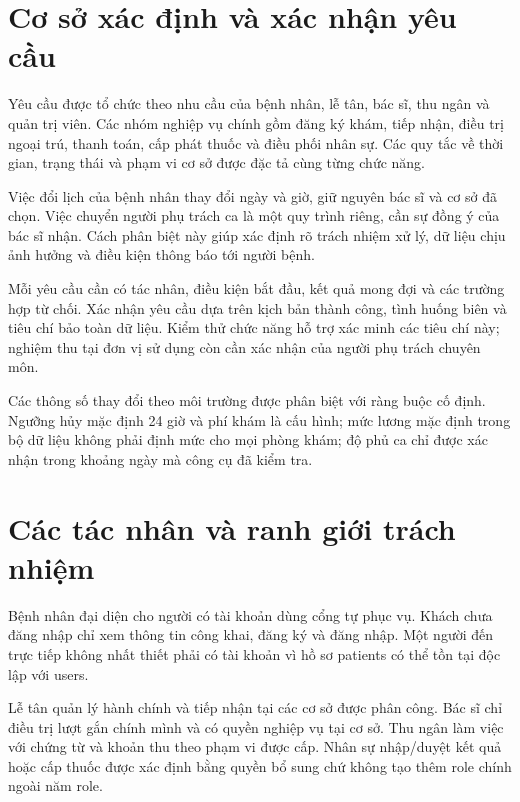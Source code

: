 \section{Cơ sở xác định và xác nhận yêu cầu}
Yêu cầu được tổ chức theo nhu cầu của bệnh nhân, lễ tân, bác sĩ, thu ngân và quản trị viên.\allowbreak{} Các nhóm nghiệp vụ chính gồm đăng ký khám, tiếp nhận, điều trị ngoại trú, thanh toán, cấp phát thuốc và điều phối nhân sự.\allowbreak{} Các quy tắc về thời gian, trạng thái và phạm vi cơ sở được đặc tả cùng từng chức năng.\allowbreak{}

Việc đổi lịch của bệnh nhân thay đổi ngày và giờ, giữ nguyên bác sĩ và cơ sở đã chọn.\allowbreak{} Việc chuyển người phụ trách ca là một quy trình riêng, cần sự đồng ý của bác sĩ nhận.\allowbreak{} Cách phân biệt này giúp xác định rõ trách nhiệm xử lý, dữ liệu chịu ảnh hưởng và điều kiện thông báo tới người bệnh.\allowbreak{}

Mỗi yêu cầu cần có tác nhân, điều kiện bắt đầu, kết quả mong đợi và các trường hợp từ chối.\allowbreak{} Xác nhận yêu cầu dựa trên kịch bản thành công, tình huống biên và tiêu chí bảo toàn dữ liệu.\allowbreak{} Kiểm thử chức năng hỗ trợ xác minh các tiêu chí này; nghiệm thu tại đơn vị sử dụng còn cần xác nhận của người phụ trách chuyên môn.\allowbreak{}

Các thông số thay đổi theo môi trường được phân biệt với ràng buộc cố định.\allowbreak{} Ngưỡng hủy mặc định 24 giờ và phí khám là cấu hình; mức lương mặc định trong bộ dữ liệu không phải định mức cho mọi phòng khám; độ phủ ca chỉ được xác nhận trong khoảng ngày mà công cụ đã kiểm tra.\allowbreak{}


\section{Các tác nhân và ranh giới trách nhiệm}
Bệnh nhân đại diện cho người có tài khoản dùng cổng tự phục vụ.\allowbreak{} Khách chưa đăng nhập chỉ xem thông tin công khai, đăng ký và đăng nhập.\allowbreak{} Một người đến trực tiếp không nhất thiết phải có tài khoản vì hồ sơ patients có thể tồn tại độc lập với users.\allowbreak{}

Lễ tân quản lý hành chính và tiếp nhận tại các cơ sở được phân công.\allowbreak{} Bác sĩ chỉ điều trị lượt gắn chính mình và có quyền nghiệp vụ tại cơ sở.\allowbreak{} Thu ngân làm việc với chứng từ và khoản thu theo phạm vi được cấp.\allowbreak{} Nhân sự nhập/\allowbreak{}duyệt kết quả hoặc cấp thuốc được xác định bằng quyền bổ sung chứ không tạo thêm role chính ngoài năm role.\allowbreak{}

